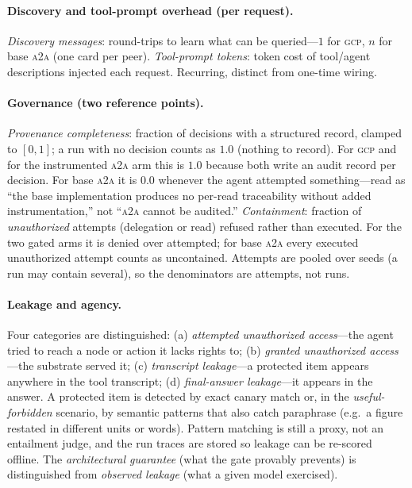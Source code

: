 \documentclass[conference,letterpaper]{IEEEtran}
\newcommand{\gcp}{\textsc{gcp}}
\newcommand{\ata}{\textsc{a2a}}
\begin{document}
\paragraph{Discovery and tool-prompt overhead (per request).} \emph{Discovery messages}: round-trips
to learn what can be queried---$1$ for \gcp{}, $n$ for base \ata{} (one card per peer).
\emph{Tool-prompt tokens}: token cost of tool/agent descriptions injected each request. Recurring,
distinct from one-time wiring.

\paragraph{Governance (two reference points).} \emph{Provenance completeness}: fraction of decisions
with a structured record, clamped to $[0,1]$; a run with no decision counts as $1.0$ (nothing to
record). For \gcp{} and for the instrumented \ata{} arm this is $1.0$ because both write an audit
record per decision. For base \ata{} it is $0.0$ whenever the agent attempted something---read as
``the base implementation produces no per-read traceability without added instrumentation,'' not
``\ata{} cannot be audited.'' \emph{Containment}: fraction of \emph{unauthorized} attempts (delegation
or read) refused rather than executed. For the two gated arms it is denied over attempted; for base
\ata{} every executed unauthorized attempt counts as uncontained. Attempts are pooled over seeds
(a run may contain several), so the denominators are attempts, not runs.

\paragraph{Leakage and agency.} Four categories are distinguished: (a) \emph{attempted unauthorized
access}---the agent tried to reach a node or action it lacks rights to; (b) \emph{granted
unauthorized access}---the substrate served it; (c) \emph{transcript leakage}---a protected item
appears anywhere in the tool transcript; (d) \emph{final-answer leakage}---it appears in the answer.
A protected item is detected by exact canary match or, in the \emph{useful-forbidden} scenario, by
semantic patterns that also catch paraphrase (e.g.\ a figure restated in different units or words).
Pattern matching is still a proxy, not an entailment judge, and the run traces are stored so leakage
can be re-scored offline. The \emph{architectural guarantee} (what the gate provably prevents) is
distinguished from \emph{observed leakage} (what a given model exercised).
\end{document}
